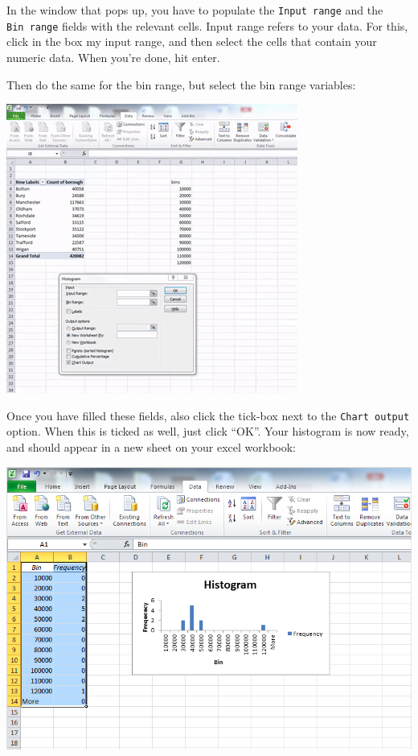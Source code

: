 \documentclass[]{book}
\theoremstyle{definition}
\theoremstyle{definition}
\theoremstyle{definition}
\theoremstyle{remark}
\begin{document}
In the window that pops up, you have to populate the
\texttt{Input\ range} and the \texttt{Bin\ range} fields with the
relevant cells. Input range refers to your data. For this, click in the
box my input range, and then select the cells that contain your numeric
data. When you're done, hit enter.

Then do the same for the bin range, but select the bin range variables:

\includegraphics{imgs/build_histo.gif}

Once you have filled these fields, also click the tick-box next to the
\texttt{Chart\ output} option. When this is ticked as well, just click
``OK''. Your histogram is now ready, and should appear in a new sheet on
your excel workbook:

\includegraphics{imgs/hist_appears.png}
\end{document}

